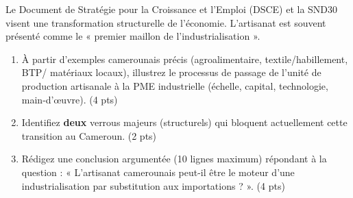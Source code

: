 \documentclass[11pt]{article}
\begin{document}
\begin{exercice}
Le Document de Stratégie pour la Croissance et l'Emploi (DSCE) et la SND30 visent une transformation structurelle de l'économie. L'artisanat est souvent présenté comme le « premier maillon de l'industrialisation ».

\begin{enumerate}
\item À partir d'exemples camerounais précis (agroalimentaire, textile/habillement, BTP/ matériaux locaux), illustrez le processus de passage de l'unité de production artisanale à la PME industrielle (échelle, capital, technologie, main-d'œuvre). \hfill (4 pts)
\item Identifiez \textbf{deux} verrous majeurs (structurels) qui bloquent actuellement cette transition au Cameroun. \hfill (2 pts)
\item Rédigez une conclusion argumentée (10 lignes maximum) répondant à la question : « L'artisanat camerounais peut-il être le moteur d'une industrialisation par substitution aux importations ? ». \hfill (4 pts)
\end{enumerate}
\end{exercice}
\end{document}
